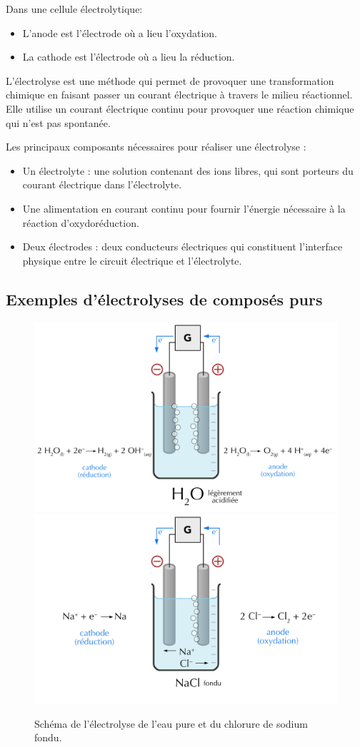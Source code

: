 \documentclass[
  11pt,
  french,
  a4paper,
  openany]{book}
\providecommand{\tightlist}{%
  \setlength{\itemsep}{0pt}\setlength{\parskip}{0pt}}
\begin{document}
Dans une cellule électrolytique:

\begin{itemize}
\tightlist
\item
  L'anode est l'électrode où a lieu l'oxydation.
\item
  La cathode est l'électrode où a lieu la réduction.
\end{itemize}

L'électrolyse est une méthode qui permet de provoquer une transformation chimique en faisant passer un courant électrique à travers le milieu réactionnel. Elle utilise un courant électrique continu pour provoquer une réaction chimique qui n'est pas spontanée.

Les principaux composants nécessaires pour réaliser une électrolyse :

\begin{itemize}
\tightlist
\item
  Un électrolyte : une solution contenant des ions libres, qui sont porteurs du courant électrique dans l'électrolyte.
\item
  Une alimentation en courant continu pour fournir l'énergie nécessaire à la réaction d'oxydoréduction.
\item
  Deux électrodes : deux conducteurs électriques qui constituent l'interface physique entre le circuit électrique et l'électrolyte.
\end{itemize}

\clearpage

\hypertarget{exemples-duxe9lectrolyses-de-composuxe9s-purs}{%
\subsection{Exemples d'électrolyses de composés purs}\label{exemples-duxe9lectrolyses-de-composuxe9s-purs}}

\begin{figure}

{\centering \includegraphics[width=0.49\linewidth]{images/electrolysis-water} \includegraphics[width=0.49\linewidth]{images/electrolysis-NaCl} 

}

\caption{Schéma de l'électrolyse de l'eau pure et du chlorure de sodium fondu.}\label{fig:electrolysis-water-NaCl}
\end{figure}
\end{document}
